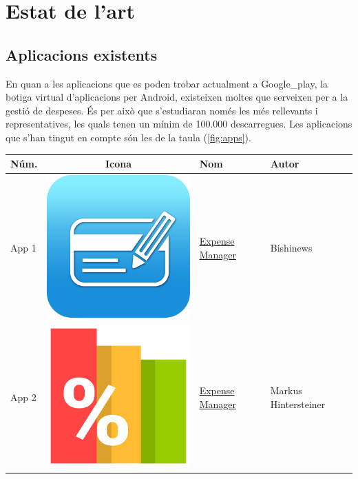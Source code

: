 \chapter{Estat de l'art}
\section{Aplicacions existents}
En quan a les aplicacions que es poden trobar actualment a \gls{Google_play}, la botiga virtual d'aplicacions per \gls{Android}, existeixen moltes que serveixen per a la gestió de despeses. És per això que s'estudiaran només les més rellevants i representatives, les quals tenen un mínim de 100.000 descarregues. Les aplicacions que s'han tingut en compte són les de la taula (\ref{fig:apps}). 

\begin{table}
\begin{tabular}{ | l | c | l | l | }
\hline
\textbf{Núm.} & \textbf{Icona} & \textbf{Nom} & \textbf{Autor} \\
\hline
App 1 & \includegraphics[scale=0.05]{A01_icon.png} & \href{https://play.google.com/store/apps/details?id=com.expensemanager}{Expense Manager} & Bishinews \\

App 2 & \includegraphics[scale=0.05]{A02_icon.png} & \href{https://play.google.com/store/apps/details?id=at.markushi.expensemanager}{Expense Manager} & Markus Hintersteiner \\


\end{tabular}
\end{table}

